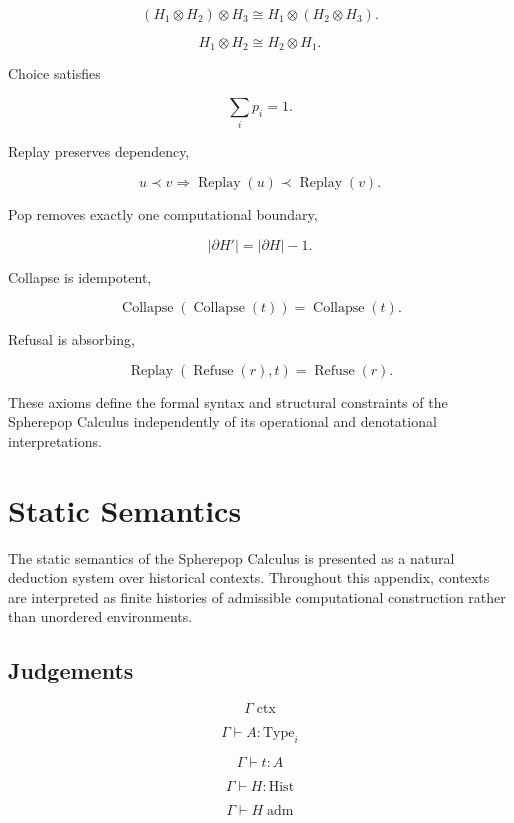 \documentclass[12pt,oneside]{article}
\theoremstyle{definition}
\theoremstyle{remark}
\begin{document}
\[
(H_1\otimes H_2)\otimes H_3
\cong
H_1\otimes(H_2\otimes H_3).
\]

\[
H_1\otimes H_2
\cong
H_2\otimes H_1.
\]

Choice satisfies

\[
\sum_i
p_i
=
1.
\]

Replay preserves dependency,

\[
u\prec v
\Longrightarrow
\operatorname{Replay}(u)
\prec
\operatorname{Replay}(v).
\]

Pop removes exactly one computational boundary,

\[
|\partial H'|
=
|\partial H|-1.
\]

Collapse is idempotent,

\[
\operatorname{Collapse}
(
\operatorname{Collapse}(t)
)
=
\operatorname{Collapse}(t).
\]

Refusal is absorbing,

\[
\operatorname{Replay}
(
\operatorname{Refuse}(r),
t
)
=
\operatorname{Refuse}(r).
\]

These axioms define the formal syntax and structural constraints of the
Spherepop Calculus independently of its operational and denotational
interpretations.

\section{Static Semantics}

The static semantics of the Spherepop Calculus is presented as a natural
deduction system over historical contexts. Throughout this appendix,
contexts are interpreted as finite histories of admissible computational
construction rather than unordered environments.

\subsection*{Judgements}

\[
\Gamma\;\text{ctx}
\]

\[
\Gamma\vdash A:\mathrm{Type}_i
\]

\[
\Gamma\vdash t:A
\]

\[
\Gamma\vdash H:\mathrm{Hist}
\]

\[
\Gamma\vdash H\;\mathrm{adm}
\]
\end{document}
